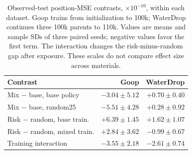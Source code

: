\begin{table}[t]
\centering\small
\caption{Observed-test position-MSE contrasts, $\times10^{-10}$, within each dataset. Goop trains from initialization to 100k; WaterDrop continues three 100k parents to 110k. Values are means and sample SDs of three paired seeds; negative values favor the first term. The interaction changes the risk-minus-random gap after exposure. These scales do not compare effect size across materials.}
\label{tab:goop-exposure-placement}
\setlength{\tabcolsep}{3pt}
\begin{tabular}{lrr}
\toprule
Contrast & Goop & WaterDrop\\
\midrule
Mix $-$ base, base policy & $-3.04\pm5.12$ & $+0.70\pm0.40$\\
Mix $-$ base, random25 & $-5.51\pm4.28$ & $+0.28\pm0.92$\\
Risk $-$ random, base train. & $+6.39\pm1.45$ & $+1.62\pm1.07$\\
Risk $-$ random, mixed train. & $+2.84\pm3.62$ & $-0.99\pm0.67$\\
Training interaction & $-3.55\pm2.18$ & $-2.61\pm0.74$\\
\bottomrule
\end{tabular}
\end{table}
